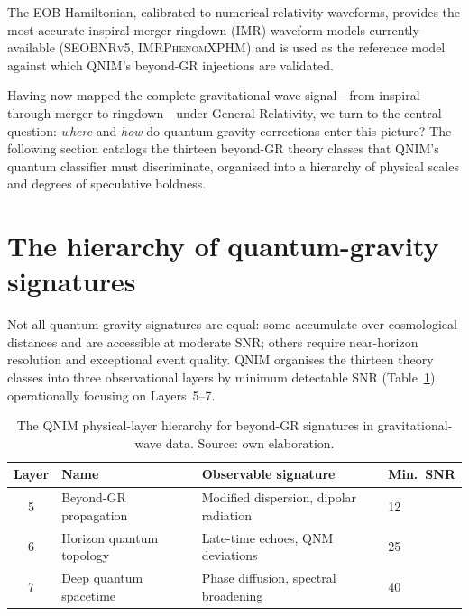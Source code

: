 \documentclass[11pt,a4paper, english]{book}
\theoremstyle{plain}
\theoremstyle{definition}
\numberwithin{equation}{chapter}
\numberwithin{figure}{chapter}
\numberwithin{table}{chapter}
\begin{document}
The EOB Hamiltonian, calibrated to numerical-relativity waveforms, provides
the most accurate inspiral-merger-ringdown (IMR) waveform models currently
available (\textsc{SEOBNRv5}, \textsc{IMRPhenomXPHM}) and is used as the
reference model against which QNIM's beyond-GR injections are validated.

Having now mapped the complete gravitational-wave signal—from inspiral through merger to ringdown—under General Relativity, we turn to the central question: \emph{where} and \emph{how} do quantum-gravity corrections enter this picture? The following section catalogs the thirteen beyond-GR theory classes that QNIM's quantum classifier must discriminate, organised into a hierarchy of physical scales and degrees of speculative boldness.

\section{The hierarchy of quantum-gravity signatures}
\label{sec:qg-hierarchy}

Not all quantum-gravity signatures are equal: some accumulate over
cosmological distances and are accessible at moderate SNR; others
require near-horizon resolution and exceptional event quality. QNIM
organises the thirteen theory classes into three observational layers
by minimum detectable SNR (Table~\ref{tab:qg-layers}), operationally
focusing on Layers~5--7.

\begin{table}[ht]
\centering
\begin{tabular}{@{}clll@{}}
\toprule
\textbf{Layer} & \textbf{Name} & \textbf{Observable signature} &
\textbf{Min.\ SNR} \\
\midrule
5 & Beyond-GR propagation & Modified dispersion, dipolar radiation & 12 \\
6 & Horizon quantum topology & Late-time echoes, QNM deviations & 25 \\
7 & Deep quantum spacetime & Phase diffusion, spectral broadening & 40 \\
\bottomrule

\end{tabular}
\caption[QNIM physical-layer hierarchy]{The QNIM physical-layer hierarchy for beyond-GR signatures in
         gravitational-wave data. Source: own elaboration.}
\label{tab:qg-layers}
\vspace{2pt}
\normalsize

\end{table}
\end{document}
